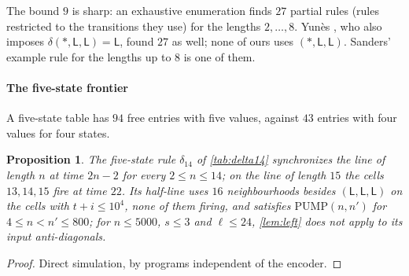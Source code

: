 \documentclass[3p]{elsarticle}
\newtheorem{proposition}[theorem]{Proposition}
\theoremstyle{remark}
\begin{document}
The bound $9$ is sharp: an exhaustive enumeration finds $27$ partial rules
(rules restricted to the transitions they use) for the lengths $2,\dots,8$.
Yun\`es \cite{Yunes93}, who also imposes $\delta(\ast,\mathsf L,\mathsf
L)=\mathsf L$, found $27$ as well; none of ours uses $(\ast,\mathsf L,\mathsf
L)$. Sanders' example rule for the lengths up to $8$ \cite{Sanders94} is one of
them.

\paragraph{The five-state frontier} A five-state table has $94$ free entries
with five values, against $43$ entries with four values for four states.

\begin{proposition}\label{prop:chaotic}
The five-state rule $\delta_{14}$ of \cref{tab:delta14} synchronizes the line
of length $n$ at time $2n-2$ for every $2\le n\le14$; on the line of length
$15$ the cells $13,14,15$ fire at time $22$. Its half-line uses $16$
neighbourhoods besides $(\mathsf L,\mathsf L,\mathsf L)$ on the cells with
$t+i\le10^4$, none of them firing, and satisfies $\mathrm{PUMP}(n,n')$ for
$4\le n<n'\le800$; for $n\le5000$, $s\le3$ and $\ell\le24$, \cref{lem:left}
does not apply to its input anti-diagonals.
\end{proposition}

\begin{proof}
Direct simulation, by programs independent of the encoder.
\end{proof}
\end{document}
